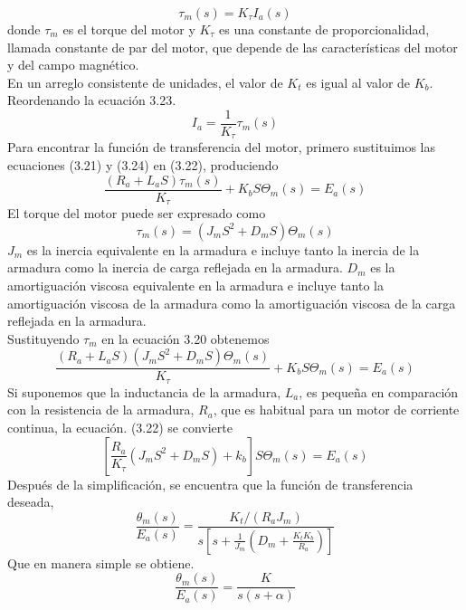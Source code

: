 \begin{equation}
	\tau_m(s) = K_\tau I_a(s)
\end{equation}
donde $\tau_m$ es el torque del motor y $K_\tau$ es una constante de proporcionalidad, llamada constante de par del motor, que depende de las características del motor y del
campo magnético.\\
En un arreglo consistente de unidades, el valor de $K_t$ es igual al valor de $K_b$. Reordenando la ecuación 3.23.
\begin{equation}
	I_a = \frac{1}{K_\tau} \tau_m (s)
\end{equation}
Para encontrar la función de transferencia del motor, primero sustituimos las ecuaciones (3.21) y (3.24) en (3.22), produciendo
\begin{equation}
	\frac{(R_a + L_aS) \tau_m(s)}{K_\tau} + K_bS \Theta_m(s) = E_a(s)
\end{equation}
El torque del motor puede ser expresado como
\begin{equation}
	\tau_m(s) = (J_mS^2 + D_mS) \Theta_m(s)
\end{equation}
$J_m$ es la inercia equivalente en la armadura e incluye tanto la inercia de la armadura como la inercia de carga reflejada en la armadura. $D_m$ es la amortiguación viscosa
equivalente en la armadura e incluye tanto la amortiguación viscosa de la armadura como la amortiguación viscosa de la carga reflejada en la armadura.\\
Sustituyendo $\tau_m$ en la ecuación 3.20 obtenemos
\begin{equation}
	\frac{(R_a + L_aS) (J_mS^2 + D_mS) \Theta_m(s) }{K_\tau} + K_bS \Theta_m(s) = E_a(s)
\end{equation}
Si suponemos que la inductancia de la armadura, $L_a$, es pequeña en comparación con la resistencia de la armadura, $R_a$, que es habitual para un motor de corriente continua,
la ecuación. (3.22) se convierte
\begin{equation}
	\left[ \frac{R_a }{K_\tau} (J_mS^2 + D_mS) + k_b \right] S\Theta_m(s)  = E_a(s)
\end{equation}
Después de la simplificación, se encuentra que la función de transferencia deseada,
\begin{equation}
	\frac{\theta_m (s)}{E_a(s)} = \frac{K_t / (R_aJ_m)}{s \left[ s + \frac{1}{J_m} \left( D_m + \frac{K_tK_b}{R_a} \right) \right]}
\end{equation}
Que en manera simple se obtiene.
\begin{equation}
	\frac{\theta_m (s)}{E_a(s)} = \frac{K}{s(s+\alpha)}
\end{equation}

